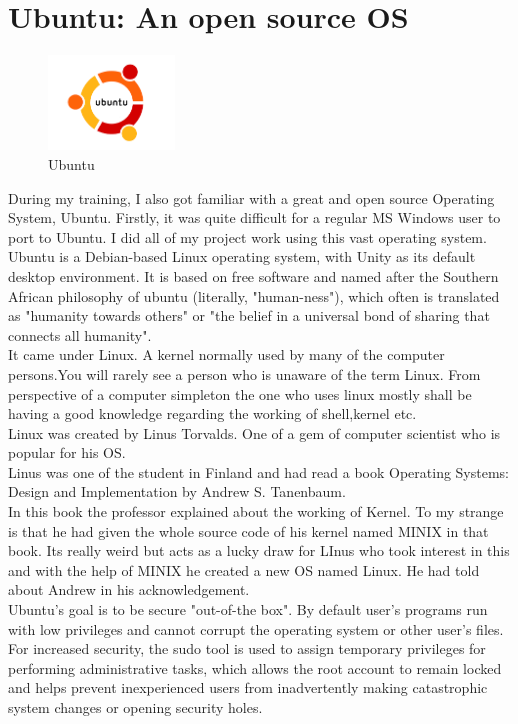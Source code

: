 
\section{Ubuntu: An open source OS}
\begin{figure}[!ht]
\centering
\includegraphics[width=0.3\textwidth]{input/images/ubuntu.png}                   
\caption{Ubuntu}
\hspace{-1.5em}
\end{figure}
During my training, I also got familiar with a great and open source Operating System, Ubuntu. Firstly, it was quite difficult for a regular MS Windows user to port to Ubuntu. I did all of my project work using this vast operating system. \\
Ubuntu is a Debian-based Linux operating system, with Unity as its default desktop environment. It is based on free software and named after the Southern African philosophy of ubuntu (literally, "human-ness"), which often is translated as "humanity towards others" or "the belief in a universal bond of sharing that connects all humanity".\\
It came under Linux. A kernel normally used by many of the computer persons.You will rarely see a person who is unaware of the term Linux. From perspective of a computer simpleton the one who uses linux mostly shall be having a good knowledge regarding the working of shell,kernel etc.\\

Linux was created by Linus Torvalds. One of a gem of computer scientist who is popular for his OS.\\
Linus was one of the student in Finland and had read a book Operating Systems: Design and Implementation by Andrew S. Tanenbaum.\\
In this book the professor explained about the working of Kernel. To my strange is that he had given the whole source code of his kernel named MINIX in that book. Its really weird but acts as a lucky draw for LInus who took interest in this and with the help of MINIX he created a new OS named Linux. He had told about Andrew in his acknowledgement.\\

Ubuntu's goal is to be secure "out-of-the box". By default user's programs run with low privileges and cannot corrupt the operating system or other user's files. For increased security, the sudo tool is used to assign temporary privileges for performing administrative tasks, which allows the root account to remain locked and helps prevent inexperienced users from inadvertently making catastrophic system changes or opening security holes.\\


